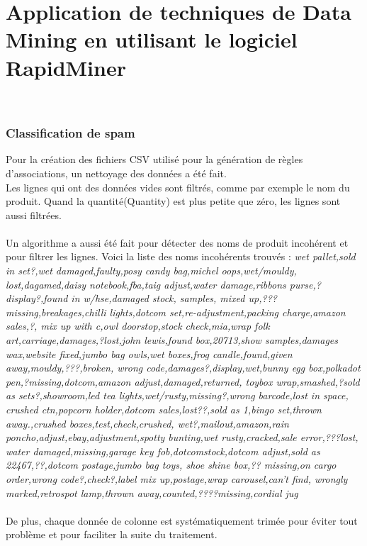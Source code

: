 \documentclass[a4paper]{article}
\begin{document}
\part*{Application de techniques de Data Mining en utilisant le logiciel RapidMiner}
 \\

\section{Classification de spam}
Pour la création des fichiers CSV utilisé pour la génération de règles d’associations, un nettoyage des données a été fait. 
\\
Les lignes qui ont des données vides sont filtrés, comme par exemple le nom du produit. Quand la quantité(Quantity) est plus petite que zéro, les lignes sont aussi filtrées. 
\\\\
Un algorithme a aussi été fait pour détecter des noms de produit incohérent et pour filtrer les lignes. Voici la liste des noms incohérents trouvés :
\textit{wet pallet,sold in set?,wet damaged,faulty,posy candy bag,michel oops,wet/mouldy,
lost,dagamed,daisy notebook,fba,taig adjust,water damage,ribbons purse,?display?,found in w/hse,damaged stock,
samples,
mixed up,???missing,breakages,chilli lights,dotcom set,re-adjustment,packing charge,amazon sales,?,
mix up with c,owl doorstop,stock check,mia,wrap folk art,carriage,damages,?lost,john lewis,found box,20713,show samples,damages wax,website fixed,jumbo bag owls,wet boxes,frog candle,found,given away,mouldy,???,broken,
wrong code,damages?,display,wet,bunny egg box,polkadot pen,?missing,dotcom,amazon adjust,damaged,returned,
toybox  wrap,smashed,?sold as sets?,showroom,led tea lights,wet/rusty,missing?,wrong barcode,lost in space,
crushed ctn,popcorn holder,dotcom sales,lost??,sold as 1,bingo set,thrown away.,crushed boxes,test,check,crushed,
wet?,mailout,amazon,rain poncho,adjust,ebay,adjustment,spotty bunting,wet rusty,cracked,sale error,???lost,
water damaged,missing,garage key fob,dotcomstock,dotcom adjust,sold as 22467,??,dotcom postage,jumbo bag toys,
shoe shine box,?? missing,on cargo order,wrong code?,check?,label mix up,postage,wrap carousel,can't find,
wrongly marked,retrospot lamp,thrown away,counted,????missing,cordial jug}
\\\\
De plus, chaque donnée de colonne est systématiquement trimée pour éviter tout problème et pour faciliter la suite du traitement. 
\\\\
\end{document}
